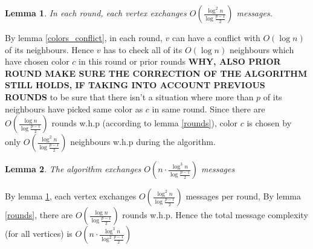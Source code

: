 \documentclass[11pt]{article}
\newtheorem{lemma}{Lemma}
\begin{document}
\begin{lemma}
\label{message_per_round}
In each round, each vertex exchanges $O(\frac{\log^2{n}}{\log{\frac{p-1}{2}}})$ messages.
\end{lemma}
By lemma \ref{colors_conflict}, in each round, $v$ can have a conflict with $O(\log{n})$ of its neighbours. Hence $v$ has to check all of its $O(\log{n})$ neighbours which have chosen color $c$ in this round or prior rounds \textbf{WHY, ALSO PRIOR ROUND MAKE SURE THE CORRECTION OF THE ALGORITHM STILL HOLDS, IF TAKING INTO ACCOUNT PREVIOUS ROUNDS} to be sure that there isn't a situation where more than $p$ of its neighbours have picked same color as $c$ in same round. Since there are $O(\frac{\log{n}}{\log{\frac{p-1}{2}}})$ rounds w.h.p (according to lemma \ref{rounds}), color $c$ is chosen by only $O(\frac{\log^2{n}}{\log{\frac{p-1}{2}}})$ neighbours w.h.p during the algorithm.

\begin{lemma}
The algorithm exchanges $O(n\cdot \frac{\log^3{n}}{\log{\frac{p-1}{2}}})$ messages
\end{lemma}
By lemma \ref{message_per_round}, each vertex exchanges $O(\frac{\log^2{n}}{\log{\frac{p-1}{2}}})$ messages per round, By lemma \ref{rounds}, there are $O(\frac{\log{n}}{\log{\frac{p-1}{2}}})$ rounds w.h.p. Hence the total message complexity (for all vertices) is $O(n\cdot \frac{\log^3{n}}{\log^2{\frac{p-1}{2}}})$
\newpage



\end{document}
